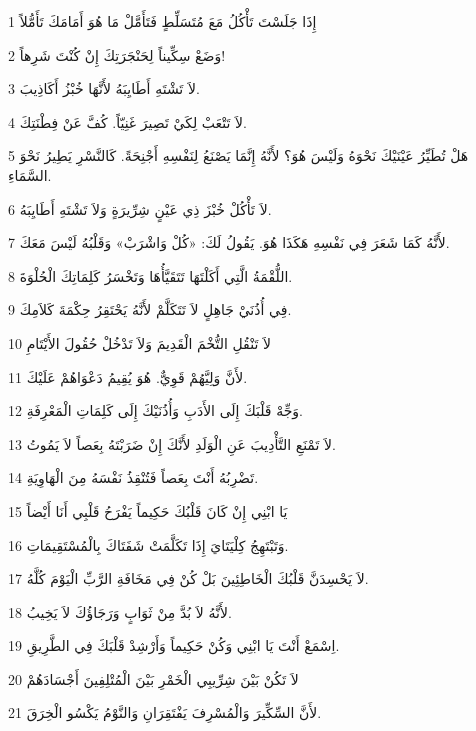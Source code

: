 \par 1 إِذَا جَلَسْتَ تَأْكُلُ مَعَ مُتَسَلِّطٍ فَتَأَمَّلْ مَا هُوَ أَمَامَكَ تَأَمُّلاً
\par 2 وَضَعْ سِكِّيناً لِحَنْجَرَتِكَ إِنْ كُنْتَ شَرِهاً!
\par 3 لاَ تَشْتَهِ أَطَايِبَهُ لأَنَّهَا خُبْزُ أَكَاذِيبَ.
\par 4 لاَ تَتْعَبْ لِكَيْ تَصِيرَ غَنِيّاً. كُفَّ عَنْ فِطْنَتِكَ.
\par 5 هَلْ تُطَيِّرُ عَيْنَيْكَ نَحْوَهُ وَلَيْسَ هُوَ؟ لأَنَّهُ إِنَّمَا يَصْنَعُ لِنَفْسِهِ أَجْنِحَةً. كَالنَّسْرِ يَطِيرُ نَحْوَ السَّمَاءِ.
\par 6 لاَ تَأْكُلْ خُبْزَ ذِي عَيْنٍ شِرِّيرَةٍ وَلاَ تَشْتَهِ أَطَايِبَهُ.
\par 7 لأَنَّهُ كَمَا شَعَرَ فِي نَفْسِهِ هَكَذَا هُوَ. يَقُولُ لَكَ: «كُلْ وَاشْرَبْ» وَقَلْبُهُ لَيْسَ مَعَكَ.
\par 8 اللُّقْمَةُ الَّتِي أَكَلْتَهَا تَتَقَيَّأُهَا وَتَخْسَرُ كَلِمَاتِكَ الْحُلْوَةَ.
\par 9 فِي أُذُنَيْ جَاهِلٍ لاَ تَتَكَلَّمْ لأَنَّهُ يَحْتَقِرُ حِكْمَةَ كَلاَمِكَ.
\par 10 لاَ تَنْقُلِ التُّخْمَ الْقَدِيمَ وَلاَ تَدْخُلْ حُقُولَ الأَيْتَامِ
\par 11 لأَنَّ وَلِيَّهُمْ قَوِيٌّ. هُوَ يُقِيمُ دَعْوَاهُمْ عَلَيْكَ.
\par 12 وَجِّهْ قَلْبَكَ إِلَى الأَدَبِ وَأُذُنَيْكَ إِلَى كَلِمَاتِ الْمَعْرِفَةِ.
\par 13 لاَ تَمْنَعِ التَّأْدِيبَ عَنِ الْوَلَدِ لأَنَّكَ إِنْ ضَرَبْتَهُ بِعَصاً لاَ يَمُوتُ.
\par 14 تَضْرِبُهُ أَنْتَ بِعَصاً فَتُنْقِذُ نَفْسَهُ مِنَ الْهَاوِيَةِ.
\par 15 يَا ابْنِي إِنْ كَانَ قَلْبُكَ حَكِيماً يَفْرَحُ قَلْبِي أَنَا أَيْضاً
\par 16 وَتَبْتَهِجُ كِلْيَتَايَ إِذَا تَكَلَّمَتْ شَفَتَاكَ بِالْمُسْتَقِيمَاتِ.
\par 17 لاَ يَحْسِدَنَّ قَلْبُكَ الْخَاطِئِينَ بَلْ كُنْ فِي مَخَافَةِ الرَّبِّ الْيَوْمَ كُلَّهُ.
\par 18 لأَنَّهُ لاَ بُدَّ مِنْ ثَوَابٍ وَرَجَاؤُكَ لاَ يَخِيبُ.
\par 19 اِسْمَعْ أَنْتَ يَا ابْنِي وَكُنْ حَكِيماً وَأَرْشِدْ قَلْبَكَ فِي الطَّرِيقِ.
\par 20 لاَ تَكُنْ بَيْنَ شِرِّيبِي الْخَمْرِ بَيْنَ الْمُتْلِفِينَ أَجْسَادَهُمْ
\par 21 لأَنَّ السِّكِّيرَ وَالْمُسْرِفَ يَفْتَقِرَانِ وَالنَّوْمُ يَكْسُو الْخِرَقَ.
